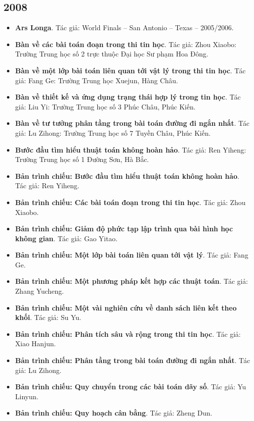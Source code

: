 \documentclass[11pt]{article}
\begin{document}
\subsection{2008}
\begin{itemize}[leftmargin=2em]
  \item \textbf{Ars Longa}. Tác giả: World Finals -- San Antonio -- Texas -- 2005/2006.
  \item \textbf{Bàn về các bài toán đoạn trong thi tin học}. Tác giả: Zhou Xiaobo: Trường Trung học số 2 trực thuộc Đại học Sư phạm Hoa Đông.
  \item \textbf{Bàn về một lớp bài toán liên quan tới vật lý trong thi tin học}. Tác giả: Fang Ge: Trường Trung học Xuejun, Hàng Châu.
  \item \textbf{Bàn về thiết kế và ứng dụng trạng thái hợp lý trong tin học}. Tác giả: Liu Yi: Trường Trung học số 3 Phúc Châu, Phúc Kiến.
  \item \textbf{Bàn về tư tưởng phân tầng trong bài toán đường đi ngắn nhất}. Tác giả: Lu Zihong: Trường Trung học số 7 Tuyền Châu, Phúc Kiến.
  \item \textbf{Bước đầu tìm hiểu thuật toán không hoàn hảo}. Tác giả: Ren Yiheng: Trường Trung học số 1 Đường Sơn, Hà Bắc.
  \item \textbf{Bản trình chiếu: Bước đầu tìm hiểu thuật toán không hoàn hảo}. Tác giả: Ren Yiheng.
  \item \textbf{Bản trình chiếu: Các bài toán đoạn trong thi tin học}. Tác giả: Zhou Xiaobo.
  \item \textbf{Bản trình chiếu: Giảm độ phức tạp lập trình qua bài hình học không gian}. Tác giả: Gao Yitao.
  \item \textbf{Bản trình chiếu: Một lớp bài toán liên quan tới vật lý}. Tác giả: Fang Ge.
  \item \textbf{Bản trình chiếu: Một phương pháp kết hợp các thuật toán}. Tác giả: Zhang Yucheng.
  \item \textbf{Bản trình chiếu: Một vài nghiên cứu về danh sách liên kết theo khối}. Tác giả: Su Yu.
  \item \textbf{Bản trình chiếu: Phân tích sâu và rộng trong thi tin học}. Tác giả: Xiao Hanjun.
  \item \textbf{Bản trình chiếu: Phân tầng trong bài toán đường đi ngắn nhất}. Tác giả: Lu Zihong.
  \item \textbf{Bản trình chiếu: Quy chuyển trong các bài toán dãy số}. Tác giả: Yu Linyun.
  \item \textbf{Bản trình chiếu: Quy hoạch cân bằng}. Tác giả: Zheng Dun.

\end{itemize}
\end{document}
